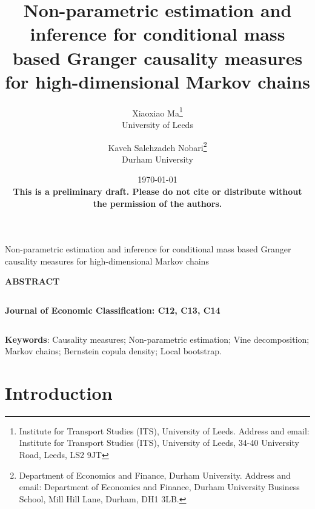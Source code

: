 \documentclass[harvard,11pt]{article}
\renewcommand{\cite}{\citeasnoun}
\renewcommand{\baselinestretch}{1.5}
\begin{document}
\title{{Non-parametric estimation and inference for conditional mass based Granger causality measures for high-dimensional Markov chains}}
\author{Xiaoxiao Ma\thanks{%
Institute for Transport Studies (ITS), University of Leeds. Address and email:
Institute for Transport Studies (ITS), University of Leeds, 34-40 University Road, Leeds, LS2 9JT}\\
University of Leeds\and Kaveh Salehzadeh Nobari\thanks{%
Department of Economics and Finance, Durham University. Address and email:
Department of Economics and Finance, Durham University Business School, Mill
Hill Lane, Durham, DH1 3LB.}\\
Durham University}
\date{\today \\
\textbf{This is a preliminary draft. Please do not cite or distribute without the permission of the authors.}}
\maketitle

\setlength{\baselineskip}{18pt}\pagestyle{plain}\newpage

\begin{center}
$\left. {}\right. ${\LARGE Non-parametric estimation and inference for conditional mass based Granger causality measures for high-dimensional Markov chains}%
\begin{equation*}
\end{equation*}

\textbf{ABSTRACT}
\end{center}

\noindent \lipsum[2-3]

$\left. {}\right.$

\noindent \textbf{Journal of Economic Classification: C12, C13, C14%
}

$\left. {}\right. $

\noindent \textbf{Keywords}: Causality measures; Non-parametric estimation; Vine decomposition; Markov chains; Bernstein copula density; Local bootstrap.\newpage

\tableofcontents%
\newpage

\section{Introduction \label{Introduction}}
\end{document}

